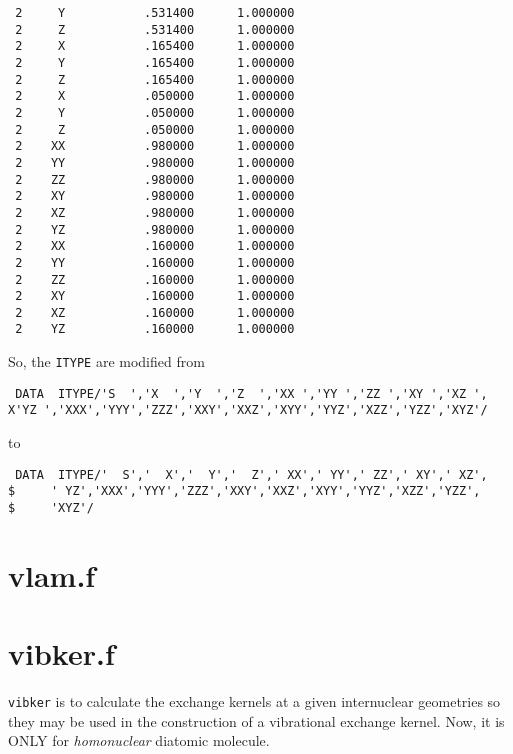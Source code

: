 \documentclass[aps,pra,groupedaddress,
                amsfonts,amssymb,
                preprint
    ]{revtex4}
\newcommand{\code}[1]{\texttt{#1}}
\begin{document}
\begin{verbatim}
 2     Y           .531400      1.000000
 2     Z           .531400      1.000000
 2     X           .165400      1.000000
 2     Y           .165400      1.000000
 2     Z           .165400      1.000000
 2     X           .050000      1.000000
 2     Y           .050000      1.000000
 2     Z           .050000      1.000000
 2    XX           .980000      1.000000
 2    YY           .980000      1.000000
 2    ZZ           .980000      1.000000
 2    XY           .980000      1.000000
 2    XZ           .980000      1.000000
 2    YZ           .980000      1.000000
 2    XX           .160000      1.000000
 2    YY           .160000      1.000000
 2    ZZ           .160000      1.000000
 2    XY           .160000      1.000000
 2    XZ           .160000      1.000000
 2    YZ           .160000      1.000000
\end{verbatim}
So, the \code{ITYPE} are modified from
\begin{verbatim}
 DATA  ITYPE/'S  ','X  ','Y  ','Z  ','XX ','YY ','ZZ ','XY ','XZ ',
X'YZ ','XXX','YYY','ZZZ','XXY','XXZ','XYY','YYZ','XZZ','YZZ','XYZ'/
\end{verbatim}
to
\begin{verbatim}
 DATA  ITYPE/'  S','  X','  Y','  Z',' XX',' YY',' ZZ',' XY',' XZ',
$     ' YZ','XXX','YYY','ZZZ','XXY','XXZ','XYY','YYZ','XZZ','YZZ',
$     'XYZ'/
\end{verbatim}

\section{vlam.f}

\section{vibker.f}
\label{sec:vibker.f}
\code{vibker} is to calculate the exchange kernels at a given
internuclear geometries so they may be used in the construction of a
vibrational exchange kernel. Now, it is ONLY for \textit{homonuclear}
diatomic molecule.
\end{document}

